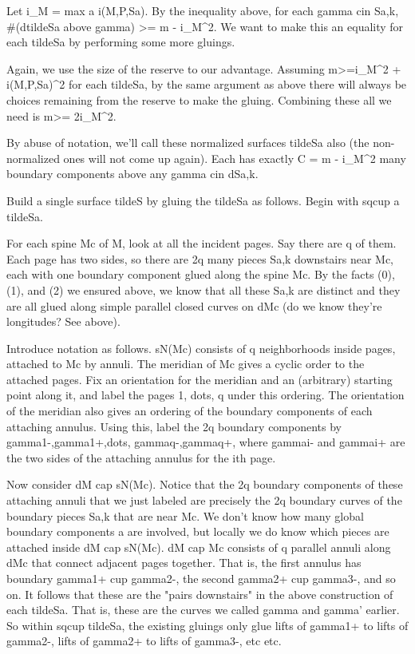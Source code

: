 \documentclass[12pt]{amsart}
\theoremstyle{definition}
\theoremstyle{remark}
\begin{document}
Let i_M = max a i(M,P,Sa). By the inequality above, for each gamma cin Sa,k,
#(dtildeSa above gamma) >= m - i_M^2. We want to make this an equality for each
tildeSa by performing some more gluings.

Again, we use the size of the reserve to our advantage. Assuming m>=i_M^2
+ i(M,P,Sa)^2 for each tildeSa, by the same argument as above there will always
be choices remaining from the reserve to make the gluing. Combining these all
we need is m>= 2i_M^2.

By abuse of notation, we'll call these normalized surfaces tildeSa also (the
non-normalized ones will not come up again). Each has exactly C = m - i_M^2
many boundary components above any gamma cin dSa,k.

Build a single surface tildeS by gluing the tildeSa as follows. Begin with
sqcup a tildeSa.

For each spine Mc of M, look at all the incident pages. Say there are q of
them.  Each page has two sides, so there are 2q many pieces Sa,k downstairs
near Mc, each with one boundary component glued along the spine Mc.  By the
facts (0), (1), and (2) we ensured above, we know that all these Sa,k are
distinct and they are all glued along simple parallel closed curves on dMc (do
we know they're longitudes?  See above).

Introduce notation as follows. sN(Mc) consists of q neighborhoods inside pages,
attached to Mc by annuli. The meridian of Mc gives a cyclic order to the
attached pages.  Fix an orientation for the meridian and an (arbitrary)
starting point along it, and label the pages 1, dots, q under this ordering.
The orientation of the meridian also gives an ordering of the boundary
components of each attaching annulus.  Using this, label the 2q boundary
components by gamma1-,gamma1+,dots, gammaq-,gammaq+, where gammai- and gammai+
are the two sides of the attaching annulus for the ith page.

Now consider dM cap sN(Mc). Notice that the 2q boundary components of these
attaching annuli that we just labeled are precisely the 2q boundary curves of
the boundary pieces Sa,k that are near Mc. We don't know how many global
boundary components a are involved, but locally we do know which pieces are
attached inside dM cap sN(Mc). dM cap Mc consists of q parallel annuli along
dMc that connect adjacent pages together. That is, the first annulus has
boundary gamma1+ cup gamma2-, the second gamma2+ cup gamma3-, and so on. It
follows that these are the "pairs downstairs" in the above construction of each
tildeSa. That is, these are the curves we called gamma and gamma' earlier. So
within sqcup tildeSa, the existing gluings only glue lifts of gamma1+ to lifts
of gamma2-, lifts of gamma2+ to lifts of gamma3-, etc etc.
\end{document}
